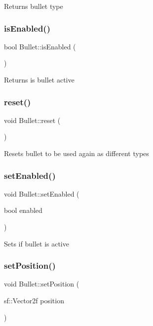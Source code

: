 Returns bullet type \mbox{\label{class_bullet_a459d9d3adb6bdd2899965e1916eafb49}} 
\subsubsection{\texorpdfstring{is\+Enabled()}{isEnabled()}}
{\footnotesize\ttfamily bool Bullet\+::is\+Enabled (\begin{DoxyParamCaption}{ }\end{DoxyParamCaption})}

Returns is bullet active \mbox{\label{class_bullet_af2e8a6860232266f180efbdb2a68f8c9}} 
\subsubsection{\texorpdfstring{reset()}{reset()}}
{\footnotesize\ttfamily void Bullet\+::reset (\begin{DoxyParamCaption}{ }\end{DoxyParamCaption})}

Resets bullet to be used again as different types \mbox{\label{class_bullet_a31f36da7eb69fdf357670f2ac7bbae85}} 
\subsubsection{\texorpdfstring{set\+Enabled()}{setEnabled()}}
{\footnotesize\ttfamily void Bullet\+::set\+Enabled (\begin{DoxyParamCaption}\item[{bool}]{enabled }\end{DoxyParamCaption})}

Sets if bullet is active \mbox{\label{class_bullet_a143a06245534960d6af5ffb10b101750}} 
\subsubsection{\texorpdfstring{set\+Position()}{setPosition()}}
{\footnotesize\ttfamily void Bullet\+::set\+Position (\begin{DoxyParamCaption}\item[{sf\+::\+Vector2f}]{position }\end{DoxyParamCaption})}

